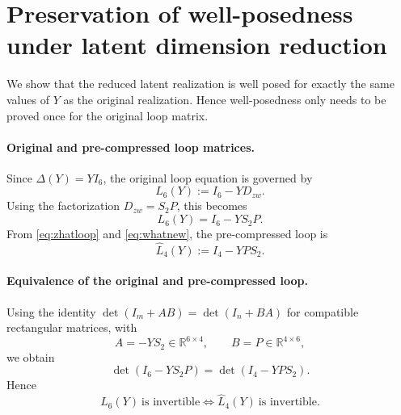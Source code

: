 \documentclass[11pt]{article}
\newcommand{\R}{\mathbb{R}}
\begin{document}
\newpage
\section{Preservation of well-posedness under latent dimension reduction}

We show that the reduced latent realization is well posed for exactly the same
values of $Y$ as the original realization. Hence well-posedness only needs to
be proved once for the original loop matrix.

\paragraph{Original and pre-compressed loop matrices.}
Since $\Delta(Y)=YI_6$, the original loop equation is governed by
\begin{equation}
    L_6(Y) := I_6 - YD_{zw}.
    \label{eq:L6_def}
\end{equation}
Using the factorization $D_{zw}=S_2P$, this becomes
\begin{equation}
    L_6(Y)=I_6-YS_2P.
    \label{eq:L6_factorized}
\end{equation}
From \eqref{eq:zhatloop} and \eqref{eq:whatnew}, the pre-compressed loop is
\begin{equation}
    \hat L_4(Y) := I_4 - YPS_2.
    \label{eq:L4hat_def}
\end{equation}

\paragraph{Equivalence of the original and pre-compressed loop.}
Using the identity $\det(I_m+AB)=\det(I_n+BA)$ for compatible rectangular
matrices, with
\[
A=-YS_2 \in \R^{6\times 4},
\qquad
B=P \in \R^{4\times 6},
\]
we obtain
\begin{equation}
    \det(I_6-YS_2P)=\det(I_4-YPS_2).
    \label{eq:WA_identity}
\end{equation}
Hence
\begin{equation}
    L_6(Y)\ \text{is invertible}
    \iff
    \hat L_4(Y)\ \text{is invertible}.
    \label{eq:L6_L4hat_equiv}
\end{equation}
\end{document}
